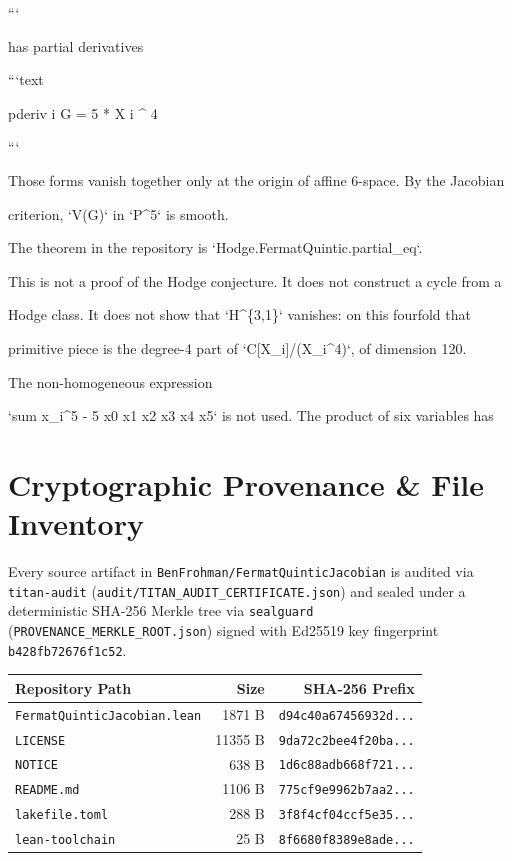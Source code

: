 \documentclass[11pt,a4paper]{article}
\begin{document}
```

has partial derivatives

```text

pderiv i G = 5 * X i \textasciicircum{} 4

```

Those forms vanish together only at the origin of affine 6-space. By the Jacobian

criterion, `V(G)` in `P\textasciicircum{}5` is smooth.

The theorem in the repository is `Hodge.FermatQuintic.partial\_eq`.

This is not a proof of the Hodge conjecture. It does not construct a cycle from a

Hodge class. It does not show that `H\textasciicircum{}\{3,1\}` vanishes: on this fourfold that

primitive piece is the degree-4 part of `C[X\_i]/(X\_i\textasciicircum{}4)`, of dimension 120.

The non-homogeneous expression

`sum x\_i\textasciicircum{}5 - 5 x0 x1 x2 x3 x4 x5` is not used. The product of six variables has

\section{Cryptographic Provenance \& File Inventory}
Every source artifact in \texttt{BenFrohman/FermatQuinticJacobian} is audited via \texttt{titan-audit}
(\texttt{audit/TITAN\_AUDIT\_CERTIFICATE.json}) and sealed under a deterministic SHA-256 Merkle tree via
\texttt{sealguard} (\texttt{PROVENANCE\_MERKLE\_ROOT.json}) signed with Ed25519 key fingerprint
\texttt{b428fb72676f1c52}.

\begin{center}
\small
\begin{tabular}{p{}rr}
\toprule
\textbf{Repository Path} & \textbf{Size} & \textbf{SHA-256 Prefix} \\
\midrule
\texttt{FermatQuinticJacobian.lean} & 1871 B & \texttt{d94c40a67456932d...} \\
\texttt{LICENSE} & 11355 B & \texttt{9da72c2bee4f20ba...} \\
\texttt{NOTICE} & 638 B & \texttt{1d6c88adb668f721...} \\
\texttt{README.md} & 1106 B & \texttt{775cf9e9962b7aa2...} \\
\texttt{lakefile.toml} & 288 B & \texttt{3f8f4cf04ccf5e35...} \\
\texttt{lean-toolchain} & 25 B & \texttt{8f6680f8389e8ade...} \\
\bottomrule
\end{tabular}
\end{center}
\end{document}
